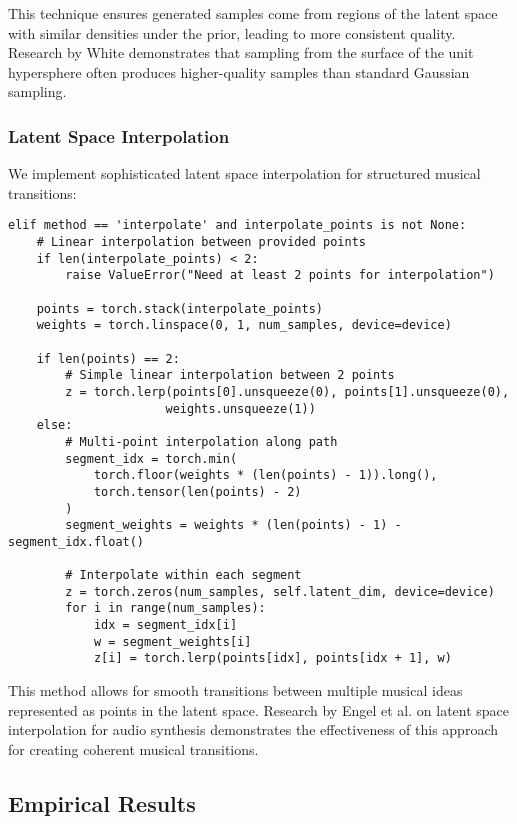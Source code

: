 \documentclass[12pt,a4paper]{article}
\begin{document}
This technique ensures generated samples come from regions of the latent space with similar densities under the prior, leading to more consistent quality. Research by White \cite{white2016sampling} demonstrates that sampling from the surface of the unit hypersphere often produces higher-quality samples than standard Gaussian sampling.

\subsubsection{Latent Space Interpolation}

We implement sophisticated latent space interpolation for structured musical transitions:

\begin{verbatim}
elif method == 'interpolate' and interpolate_points is not None:
    # Linear interpolation between provided points
    if len(interpolate_points) < 2:
        raise ValueError("Need at least 2 points for interpolation")
        
    points = torch.stack(interpolate_points)
    weights = torch.linspace(0, 1, num_samples, device=device)
    
    if len(points) == 2:
        # Simple linear interpolation between 2 points
        z = torch.lerp(points[0].unsqueeze(0), points[1].unsqueeze(0), 
                      weights.unsqueeze(1))
    else:
        # Multi-point interpolation along path
        segment_idx = torch.min(
            torch.floor(weights * (len(points) - 1)).long(),
            torch.tensor(len(points) - 2)
        )
        segment_weights = weights * (len(points) - 1) - segment_idx.float()
        
        # Interpolate within each segment
        z = torch.zeros(num_samples, self.latent_dim, device=device)
        for i in range(num_samples):
            idx = segment_idx[i]
            w = segment_weights[i]
            z[i] = torch.lerp(points[idx], points[idx + 1], w)
\end{verbatim}

This method allows for smooth transitions between multiple musical ideas represented as points in the latent space. Research by Engel et al. \cite{engel2017neural} on latent space interpolation for audio synthesis demonstrates the effectiveness of this approach for creating coherent musical transitions.

\subsection{Empirical Results}
\end{document}
